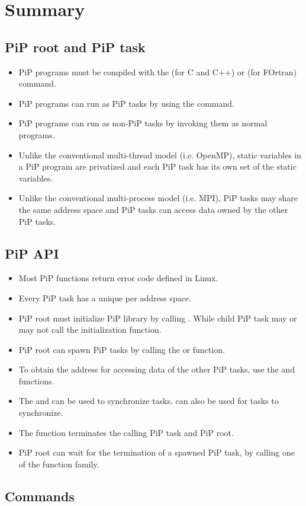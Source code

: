 
\section{Summary}

\subsection*{PiP root and PiP task}

\begin{itemize}
\item PiP programs must be compiled with the  
  (for C and C++) or  (for  FOrtran) command.
\item PiP programs can run as PiP tasks by using the
   command. 
\item PiP programs can run as non-PiP tasks by invoking them as normal
  programs.
\item Unlike the conventional multi-thread model (i.e. OpenMP), static
  variables in a PiP program are privatized and each PiP task has its
  own set of the static variables.
\item Unlike the conventional multi-process model (i.e. MPI), PiP
  tasks may share the same address space and PiP tasks can access data
  owned by the other PiP tasks. 
\end{itemize}

\subsection*{PiP API}

\begin{itemize}
\item Most PiP functions return error code defined in Linux.
\item Every PiP task has a unique {\PIPID} per address space.
\item PiP root must initialize PiP library by calling
  . While child PiP task may or may not call the
  initialization function.
\item PiP root can spawn PiP tasks by calling the
   or  function.
\item To obtain the address for accessing data of the other PiP tasks,
  use the  and
   functions.  
\item The  and 
  can be used to synchronize tasks.  can
  also be used for tasks to synchronize.
\item The  function terminates the calling PiP
  task and PiP root.
\item PiP root can wait for the termination of a spawned PiP task, by
  calling one of the  function family.
\end{itemize}

\subsection*{Commands}

